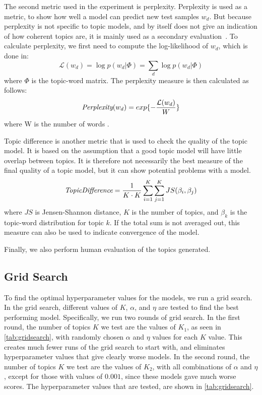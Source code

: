 The second metric used in the experiment is perplexity.
Perplexity is used as a metric, to show how well a model can predict new test samples $w_d$.
But because perplexity is not specific to topic models, and by itself does not give an indication of how coherent topics are, it is mainly used as a secondary evaluation~\cite{tea_leaves}.
To calculate perplexity, we first need to compute the log-likelihood of $w_d$, which is done in:
\begin{equation}\label{eq:likelihood}
	\mathcal{L}(w_d) = \log p(w_d|\Phi) = \sum_{d} \log p(w_d|\Phi)
\end{equation}
\noindent where $\Phi$ is the topic-word matrix.
The perplexity measure is then calculated as follows:
\begin{equation}
	\emph{Perplexity}(w_d) = exp \{-\frac{\mathcal{L}(w_d)}{W}\}
\end{equation}
\noindent where W is the number of words \cite{de2008evaluating}.

Topic difference is another metric that is used to check the quality of the topic model.
It is based on the assumption that a good topic model will have little overlap between topics.
It is therefore not necessarily the best measure of the final quality of a topic model, but it can show potential problems with a model.
\begin{equation}
	\emph{TopicDifference} = \frac{1}{K \cdot K} \sum_{i=1}^{K} \sum_{j=1}^{K} JS(\beta_{i},\beta_{j})
\end{equation}
\noindent where $JS$ is Jensen-Shannon distance, $K$ is the number of topics, and $\beta_{k}$ is the topic-word distribution for topic $k$.
If the total sum is not averaged out, this measure can also be used to indicate convergence of the model.

Finally, we also perform human evaluation of the topics generated.

\subsection{Grid Search}\label{sec:experiment_gridsearch}
To find the optimal hyperparameter values for the models, we run a grid search.
In the grid search, different values of $K$, $\alpha$, and $\eta$ are tested to find the best performing model.
Specifically, we run two rounds of grid search.
In the first round, the number of topics $K$ we test are the values of $K_1$, as seen in \autoref{tab:gridsearch}, with randomly chosen $\alpha$ and $\eta$ values for each $K$ value.
This creates much fewer runs of the grid search to start with, and eliminates hyperparameter values that give clearly worse models.
In the second round, the number of topics $K$ we test are the values of $K_2$, with all combinations of $\alpha$ and $\eta$, except for those with values of $0.001$, since these models gave much worse scores.
The hyperparameter values that are tested, are shown in \autoref{tab:gridsearch}.

